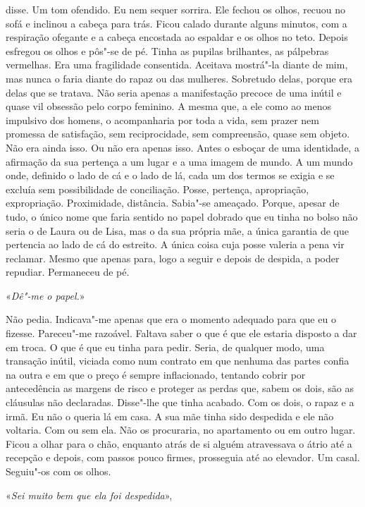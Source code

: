disse. Um tom ofendido. Eu nem sequer sorrira. Ele fechou os olhos,
recuou no sofá e inclinou a cabeça para trás. Ficou calado durante
alguns minutos, com a respiração ofegante e a cabeça encostada ao
espaldar e os olhos no teto. Depois esfregou os olhos e pôs"-se de pé.
Tinha as pupilas brilhantes, as pálpebras vermelhas. Era uma fragilidade
consentida. Aceitava mostrá"-la diante de mim, mas nunca o faria diante
do rapaz ou das mulheres. Sobretudo delas, porque era delas que se
tratava. Não seria apenas a manifestação precoce de uma inútil e quase
vil obsessão pelo corpo feminino. A mesma que, a ele como ao menos
impulsivo dos homens, o acompanharia por toda a vida, sem prazer nem
promessa de satisfação, sem reciprocidade, sem compreensão, quase sem
objeto. Não era ainda isso. Ou não era apenas isso. Antes o esboçar de
uma identidade, a afirmação da sua pertença a um lugar e a uma imagem de
mundo. A um mundo onde, definido o lado de cá e o lado de lá, cada um
dos termos se exigia e se excluía sem possibilidade de conciliação.
Posse, pertença, apropriação, expropriação. Proximidade, distância.
Sabia"-se ameaçado. Porque, apesar de tudo, o único nome que faria
sentido no papel dobrado que eu tinha no bolso não seria o de Laura ou
de Lisa, mas o da sua própria mãe, a única garantia de que pertencia ao
lado de cá do estreito. A única coisa cuja posse valeria a pena vir
reclamar. Mesmo que apenas para, logo a seguir e depois de despida, a
poder repudiar. Permaneceu de pé.

«\emph{Dê"-me o papel.}»

Não pedia. Indicava"-me apenas que era o momento adequado para que eu o
fizesse. Pareceu"-me razoável. Faltava saber o que é que ele estaria
disposto a dar em troca. O que é que eu tinha para pedir. Seria, de
qualquer modo, uma transação inútil, viciada como num contrato em que
nenhuma das partes confia na outra e em que o preço é sempre
inflacionado, tentando cobrir por antecedência as margens de risco e
proteger as perdas que, sabem os dois, são as cláusulas não declaradas.
Disse"-lhe que tinha acabado. Com os dois, o rapaz e a irmã. Eu não o
queria lá em casa. A sua mãe tinha sido despedida e ele não voltaria.
Com ou sem ela. Não os procuraria, no apartamento ou em outro lugar.
Ficou a olhar para o chão, enquanto atrás de si alguém atravessava o
átrio até a recepção e depois, com passos pouco firmes, prosseguia até
ao elevador. Um casal. Seguiu"-os com os olhos.

«\emph{Sei muito bem que ela foi despedida}»,

